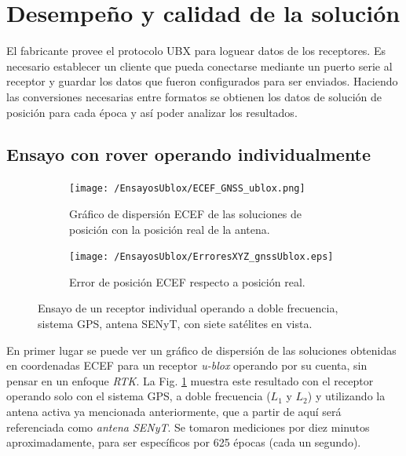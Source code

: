 \documentclass[a4paper,12pt,oneside,onecolumn,final,openright]{book}%
\begin{document}
\section{Desempeño y calidad de la solución}
	El fabricante provee el protocolo UBX para loguear datos de los receptores. Es necesario establecer un cliente que pueda conectarse mediante un puerto serie al receptor y guardar los datos que fueron configurados para ser enviados. Haciendo las conversiones necesarias entre formatos se obtienen los datos de solución de posición para cada época y así poder analizar los resultados.
\subsection{Ensayo con rover operando individualmente}\label{sec:rover_alone}
\begin{figure}

\begin{subfigure}{1\linewidth}
\centering
  	\texttt{[image: /EnsayosUblox/ECEF\_GNSS\_ublox.png]}
  	\caption{Gráfico de dispersión ECEF de las soluciones de posición con la posición real de la antena.}
    \label{fig:scatter_ublox_GNSS}
\end{subfigure}

\begin{subfigure}{1\linewidth}
\centering
 	\texttt{[image: /EnsayosUblox/ErroresXYZ\_gnssUblox.eps]}
 	\caption{Error de posición ECEF respecto a posición real.}
  	\label{fig:error_ublox_GNSS}

\end{subfigure}
\caption{Ensayo de un receptor individual operando a doble frecuencia, sistema GPS, antena SENyT, con siete satélites en vista.}
\label{fig:ensayoGNSS_ublox}
\end{figure}
	En primer lugar se puede ver un gráfico de dispersión de las soluciones obtenidas en coordenadas ECEF para un receptor \textit{u-blox} operando por su cuenta, sin pensar en un enfoque \textit{RTK}. La Fig. \ref{fig:scatter_ublox_GNSS} muestra este resultado con el receptor operando solo con el sistema GPS, a doble frecuencia ($L_1$ y $L_2$) y utilizando la antena activa ya mencionada anteriormente, que a partir de aquí será referenciada como \textit{antena SENyT}. Se tomaron mediciones por diez minutos aproximadamente, para ser específicos por 625 épocas (cada un segundo).
\end{document}
